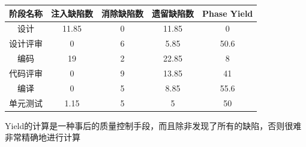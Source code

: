 \vspace{-0.5em}
\begin{table}[H]
    \centering
    \begin{tabular}{|c|c|c|c|c|}
    \hline
    \textbf{阶段名称} & \textbf{注入缺陷数} & \textbf{消除缺陷数} & \textbf{遗留缺陷数} & \textbf{Phase Yield}    \\ \hline
    设计            & 11.85             & 0              & 11.85             & 0                       \\ \hline
    设计评审          & 0              & 6              & 5.85              & 50.6    \\ \hline
    编码            & 19             & 2              & 22.85             & 8     \\ \hline
    代码评审          & 0              & 9              & 13.85              & 41 \\ \hline
    编译            & 0              & 5              & 8.85              & 55.6     \\ \hline
    单元测试          & 1.15             & 5              & 5              & 50   \\ \hline
    \end{tabular}
\end{table}
\vspace{-1em}

Yield的计算是一种事后的质量控制手段，而且除非发现了所有的缺陷，否则很难非常精确地进行计算

